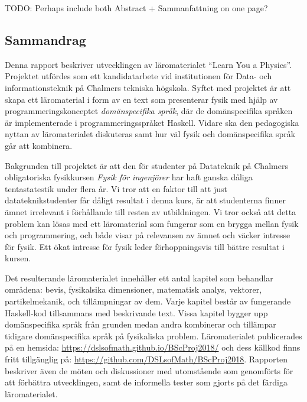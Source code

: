 
\thispagestyle{plain}			%

TODO: Perhaps include both Abstract + Sammanfattning on one page?

\begin{binge}

\section*{Sammandrag}

Denna rapport beskriver utvecklingen av läromaterialet ``Learn You a
Physics''. Projektet utfördes som ett kandidatarbete vid institutionen
för Data- och informationsteknik på Chalmers tekniska högskola. Syftet
med projektet är att skapa ett läromaterial i form av en text som
presenterar fysik med hjälp av programmeringskonceptet
\textit{domänspecifika språk}, där de domänspecifika språken är
implementerade i programmeringsspråket Haskell. Vidare ska 
den pedagogiska nyttan av läromaterialet diskuteras samt hur väl fysik och
domänspecifika språk går att kombinera.

Bakgrunden till projektet är att den för studenter på Datateknik på
Chalmers obligatoriska fysikkursen \textit{Fysik för ingenjörer} har
haft ganska dåliga tentastatestik under flera år. Vi tror att en
faktor till att just datateknikstudenter får dåligt resultat i denna
kurs, är att studenterna finner ämnet irrelevant i förhållande till
resten av utbildningen. Vi tror också att detta problem kan lösas med ett
läromaterial som fungerar som en brygga mellan fysik och
programmering, och både visar på relevansen av ämnet och väcker
intresse för fysik. Ett ökat intresse för fysik leder förhoppningsvis
till bättre resultat i kursen.

Det resulterande läromaterialet innehåller ett antal kapitel som
behandlar områdena: bevis, fysikalsika dimensioner, matematisk analys,
vektorer, partikelmekanik, och tillämpningar av dem. Varje kapitel
består av fungerande Haskell-kod tillsammans med beskrivande
text. Vissa kapitel bygger upp domänspecifika språk från grunden medan
andra kombinerar och tillämpar tidigare domänspecifika språk på
fysikaliska problem. Läromaterialet publicerades på en hemsida:
\url{https://dslsofmath.github.io/BScProj2018/} och dess källkod finns
fritt tillgänglig på:
\url{https://github.com/DSLsofMath/BScProj2018}. Rapporten beskriver
även de möten och diskussioner med utomstående som genomförts för att
förbättra utvecklingen, samt de informella tester som gjorts på det
färdiga läromaterialet.


\end{binge}
